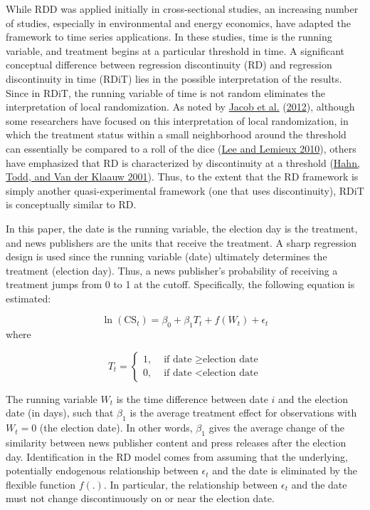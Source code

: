 \documentclass[
  12pt,
]{article}
\begin{document}
While RDD was applied initially in cross-sectional studies, an
increasing number of studies, especially in environmental and energy
economics, have adapted the framework to time series applications. In
these studies, time is the running variable, and treatment begins at a
particular threshold in time. A significant conceptual difference
between regression discontinuity (RD) and regression discontinuity in
time (RDiT) lies in the possible interpretation of the results. Since in
RDiT, the running variable of time is not random eliminates the
interpretation of local randomization. As noted by
\protect\hyperlink{ref-jacob_practical_2012}{Jacob et al.}
(\protect\hyperlink{ref-jacob_practical_2012}{2012}), although some
researchers have focused on this interpretation of local randomization,
in which the treatment status within a small neighborhood around the
threshold can essentially be compared to a roll of the dice
(\protect\hyperlink{ref-lee_regression_2010}{Lee and Lemieux 2010}),
others have emphasized that RD is characterized by discontinuity at a
threshold (\protect\hyperlink{ref-hahn_identification_2001}{Hahn, Todd,
and Van der Klaauw 2001}). Thus, to the extent that the RD framework is
simply another quasi-experimental framework (one that uses
discontinuity), RDiT is conceptually similar to RD.

In this paper, the date is the running variable, the election day is the
treatment, and news publishers are the units that receive the treatment.
A sharp regression design is used since the running variable (date)
ultimately determines the treatment (election day). Thus, a news
publisher's probability of receiving a treatment jumps from 0 to 1 at
the cutoff. Specifically, the following equation is estimated:

\[
\ln(\text{CS}_{t})=\beta_0+\beta_1T_t+f(W_t)+\epsilon_t
\] where

\[
T_t = 
\begin{cases}
1, & \text{ if date } \geq \text{election date} \\
0, & \text{ if date } < \text{election date}
\end{cases}
\]

The running variable \(W_t\) is the time difference between date \(i\)
and the election date (in days), such that \(\beta_1\) is the average
treatment effect for observations with \(W_t = 0\) (the election date).
In other words, \(\beta_1\) gives the average change of the similarity
between news publisher content and press releases after the election
day. Identification in the RD model comes from assuming that the
underlying, potentially endogenous relationship between \(\epsilon_t\)
and the date is eliminated by the flexible function \(f(.)\). In
particular, the relationship between \(\epsilon_t\) and the date must
not change discontinuously on or near the election date.
\end{document}
